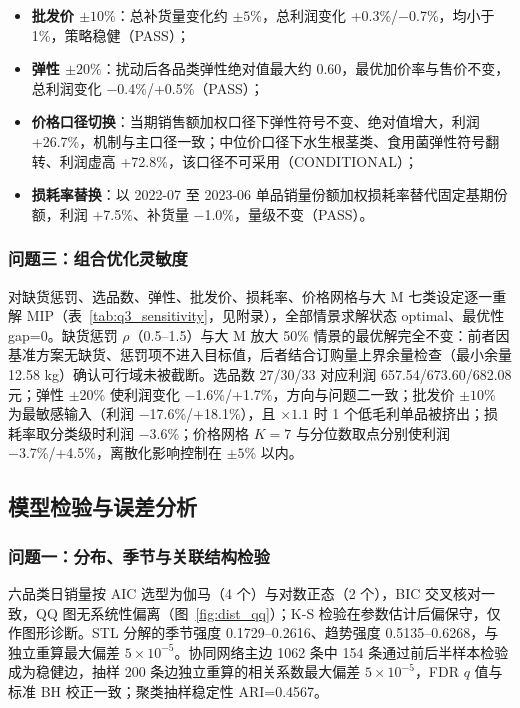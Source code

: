 \begin{itemize}
    \item \textbf{批发价 $\pm10\%$}：总补货量变化约 $\pm5\%$，总利润变化 +0.3\%/−0.7\%，均小于 1\%，策略稳健（PASS）；
    \item \textbf{弹性 $\pm20\%$}：扰动后各品类弹性绝对值最大约 0.60，最优加价率与售价不变，总利润变化 −0.4\%/+0.5\%（PASS）；
    \item \textbf{价格口径切换}：当期销售额加权口径下弹性符号不变、绝对值增大，利润 +26.7\%，机制与主口径一致；中位价口径下水生根茎类、食用菌弹性符号翻转、利润虚高 +72.8\%，该口径不可采用（CONDITIONAL）；
    \item \textbf{损耗率替换}：以 2022-07 至 2023-06 单品销量份额加权损耗率替代固定基期份额，利润 +7.5\%、补货量 −1.0\%，量级不变（PASS）。
\end{itemize}

\subsubsection{问题三：组合优化灵敏度}

对缺货惩罚、选品数、弹性、批发价、损耗率、价格网格与大 M 七类设定逐一重解 MIP（表~\ref{tab:q3_sensitivity}，见附录），全部情景求解状态 optimal、最优性 gap=0。缺货惩罚 $\rho$（0.5--1.5）与大 M 放大 50\% 情景的最优解完全不变：前者因基准方案无缺货、惩罚项不进入目标值，后者结合订购量上界余量检查（最小余量 12.58 kg）确认可行域未被截断。选品数 27/30/33 对应利润 657.54/673.60/682.08 元；弹性 $\pm20\%$ 使利润变化 −1.6\%/+1.7\%，方向与问题二一致；批发价 $\pm10\%$ 为最敏感输入（利润 −17.6\%/+18.1\%），且 $\times1.1$ 时 1 个低毛利单品被挤出；损耗率取分类级时利润 −3.6\%；价格网格 $K=7$ 与分位数取点分别使利润 −3.7\%/+4.5\%，离散化影响控制在 $\pm5\%$ 以内。

\subsection{模型检验与误差分析}

\subsubsection{问题一：分布、季节与关联结构检验}

六品类日销量按 AIC 选型为伽马（4 个）与对数正态（2 个），BIC 交叉核对一致，QQ 图无系统性偏离（图~\ref{fig:dist_qq}）；K-S 检验在参数估计后偏保守，仅作图形诊断。STL 分解的季节强度 0.1729--0.2616、趋势强度 0.5135--0.6268，与独立重算最大偏差 $5\times10^{-5}$。协同网络主边 1062 条中 154 条通过前后半样本检验成为稳健边，抽样 200 条边独立重算的相关系数最大偏差 $5\times10^{-5}$，FDR $q$ 值与标准 BH 校正一致；聚类抽样稳定性 ARI=0.4567。

